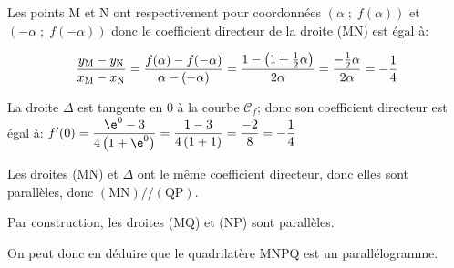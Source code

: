 \begin{enumerate}
\begin{enumerate}
Les points M et N ont respectivement pour coordonnées $\left (\alpha\;;\;f(\alpha)\right )$ et $\left (-\alpha\;;\;f(-\alpha)\right )$ donc le coefficient directeur de la droite (MN) est égal à:

\[\dfrac{y_{\text M} - y_{\text N}}{x_{\text M} - x_{\text N}}
= \dfrac{f(\alpha) - f(-\alpha)}{\alpha-(-\alpha)}
= \dfrac{1-\left (1+\frac{1}{2}\alpha\right )}{2\alpha}
= \dfrac{-\frac{1}{2}\alpha}{2\alpha}
= -\dfrac{1}{4}\]

La droite $\Delta$ est tangente en 0 à la courbe $\mathcal{C}_f$; donc son coefficient directeur est égal à:
$f'(0)=\dfrac{\e^{0}-3}{4\left (1+\e^{0}\right )}
= \dfrac{1-3}{4\left (1+1\right )}
= \dfrac{-2}{8}
= -\dfrac{1}{4}$

Les droites (MN) et $\Delta$ ont le même coefficient directeur, donc elles sont parallèles, donc $(\text{MN}) /\!/ (\text{QP})$.

Par construction, les droites (MQ) et (NP) sont parallèles.

On peut donc en déduire que le quadrilatère MNPQ est un parallélogramme.
	\end{enumerate}
\end{enumerate}
